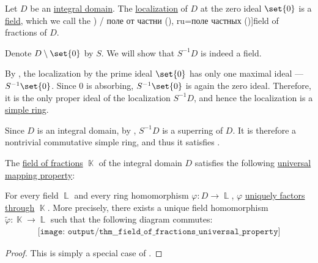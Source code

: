 \begin{definition}\label{def:field_of_fractions}
  Let \( D \) be an \hyperref[def:integral_domain]{integral domain}. The \hyperref[def:ring_localization]{localization} of \( D \) at the zero ideal \( \set{ 0 } \) is a \hyperref[def:field]{field}, which we call the \term[bg=поле на отношенията (\cite[399]{Обрешков1962ВисшаАлгебра}) / поле от частни (\cite[def. V.16]{ГеновМиховскиМоллов1991Алгебра}), ru=поле частных (\cite[26]{Шафаревич1999Алгебра})]{field of fractions} of \( D \).
\end{definition}
\begin{defproof}
  Denote \( D \setminus \set{ 0 } \) by \( S \). We will show that \( S^{-1} D \) is indeed a field.

  By , the localization by the prime ideal \( \set{ 0 } \) has only one maximal ideal --- \( S^{-1} \set{ 0 } \). Since \( 0 \) is absorbing, \( S^{-1} \set{ 0 } \) is again the zero ideal. Therefore, it is the only proper ideal of the localization \( S^{-1} D \), and hence the localization is a \hyperref[def:simple_object]{simple ring}.

  Since \( D \) is an integral domain, by , \( S^{-1} D \) is a superring of \( D \). It is therefore a nontrivial commutative simple ring, and thus it satisfies .
\end{defproof}

\begin{theorem}\label{def:field_of_fractions_universal_property}
  The \hyperref[def:field_of_fractions]{field of fractions} \( \BbbK \) of the integral domain \( D \) satisfies the following \hyperref[rem:universal_mapping_property]{universal mapping property}:
  \begin{displayquote}
    For every field \( \BbbL \) and every ring homomorphism \( \varphi: D \to \BbbL \), \( \varphi \) \hyperref[def:factors_through]{uniquely factors through} \( \BbbK \). More precisely, there exists a unique field homomorphism \( \widetilde{\varphi}: \BbbK \to \BbbL \) such that the following diagram commutes:
    \begin{equation}\label{eq:def:field_of_fractions_universal_property/diagram}
      \begin{aligned}
        \texttt{[image: output/thm\_\_field\_of\_fractions\_universal\_property]}
      \end{aligned}
    \end{equation}
  \end{displayquote}
\end{theorem}
\begin{proof}
  This is simply a special case of .
\end{proof}

